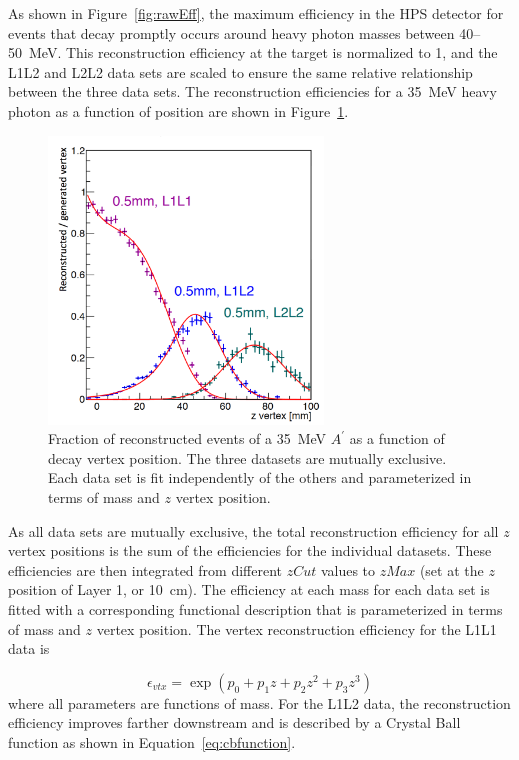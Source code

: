 As shown in Figure~\ref{fig:rawEff}, the maximum efficiency in the HPS detector for events that decay promptly occurs around heavy photon masses between 40--50~MeV. This reconstruction efficiency at the target is normalized to 1, and the L1L2 and L2L2 data sets are scaled to ensure the same relative relationship between the three data sets. The reconstruction efficiencies for a 35~MeV heavy photon as a function of position are shown in Figure~\ref{fig:apEff}. 

\begin{figure}[htb]
  \centering
      \includegraphics[width=0.65\textwidth]{pics/searching/reconstructedVtx.png}
  \caption[Fraction of reconstructed events of a 35~MeV $A^{\prime}$ as a function of decay vertex position]{Fraction of reconstructed events of a 35~MeV $A^{\prime}$ as a function of decay vertex position. The three datasets are mutually exclusive. Each data set is fit independently of the others and parameterized in terms of mass and $z$ vertex position. }
  \label{fig:apEff}
\end{figure} 
As all data sets are mutually exclusive, the total reconstruction efficiency for all $z$ vertex positions is the sum of the efficiencies for the individual datasets. These efficiencies are then integrated from different $zCut$ values to $zMax$ (set at the $z$ position of Layer 1, or 10~cm). The efficiency at each mass for each data set is fitted with a corresponding functional description that is parameterized in terms of mass and $z$ vertex position. The vertex reconstruction efficiency for the L1L1 data is 

\begin{equation}
\label{eq:promptfunction}
\epsilon_{vtx} = \exp(p_0+p_1z+p_2z^2+p_3z^3) 
\end{equation}
where all parameters are functions of mass. For the L1L2 data, the reconstruction efficiency improves farther downstream and is described by a Crystal Ball function as shown in Equation~\eqref{eq:cbfunction}.

